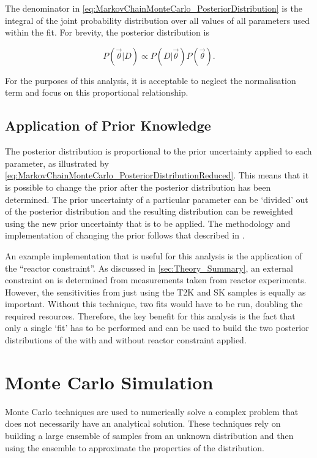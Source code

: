 The denominator in \autoref{eq:MarkovChainMonteCarlo_PosteriorDistribution} is the integral of the joint probability distribution over all values of all parameters used within the fit. For brevity, the posterior distribution is

\begin{equation}
  \label{eq:MarkovChainMonteCarlo_PosteriorDistributionReduced}
  P(\vec{\theta}|D) \propto P(D|\vec{\theta}) P(\vec{\theta}).
\end{equation}

For the purposes of this analysis, it is acceptable to neglect the normalisation term and focus on this proportional relationship.

\subsection{Application of Prior Knowledge}
\label{sec:MarkovChainMonteCarlo_Priors}

The posterior distribution is proportional to the prior uncertainty applied to each parameter, as illustrated by \autoref{eq:MarkovChainMonteCarlo_PosteriorDistributionReduced}. This means that it is possible to change the prior after the posterior distribution has been determined. The prior uncertainty of a particular parameter can be `divided' out of the posterior distribution and the resulting distribution can be reweighted using the new prior uncertainty that is to be applied. The methodology and implementation of changing the prior follows that described in \cite{thesis_artur}. 

An example implementation that is useful for this analysis is the application of the ``reactor constraint''. As discussed in \autoref{sec:Theory_Summary}, an external constraint on  is determined from measurements taken from reactor experiments. However, the sensitivities from just using the T2K and SK samples is equally as important. Without this technique, two fits would have to be run, doubling the required resources. Therefore, the key benefit for this analysis is the fact that only a single `fit' has to be performed and can be used to build the two posterior distributions of the with and without reactor constraint applied.

\section{Monte Carlo Simulation}
\label{sec:MarkovChainMonteCarlo_MonteCarloSimulation}
Monte Carlo techniques are used to numerically solve a complex problem that does not necessarily have an analytical solution. These techniques rely on building a large ensemble of samples from an unknown distribution and then using the ensemble to approximate the properties of the distribution.

